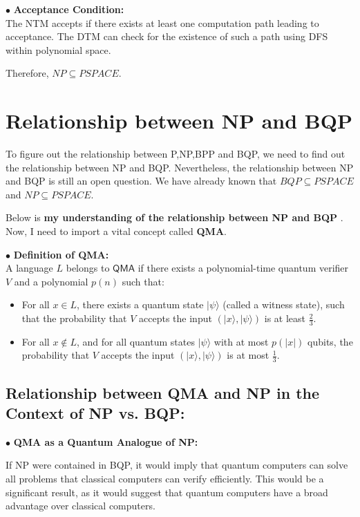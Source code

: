 \documentclass[a4paper]{article}
\begin{document}
\noindent $\bullet$ \textbf{Acceptance Condition:}\\
The NTM accepts if there exists at least one computation path leading to acceptance.
The DTM can check for the existence of such a path using DFS within polynomial space.

Therefore, $NP \subseteq PSPACE$.

\section{Relationship between NP and BQP}
To figure out the relationship between P,NP,BPP and BQP, we need to find out the relationship between NP and BQP. Nevertheless, the relationship between NP and BQP is still an open question. 
We have already known that $BQP \subseteq  PSPACE$ and $NP \subseteq PSPACE$.

Below is \textbf{my understanding of the relationship between NP and BQP} . 
Now, I need to import a vital concept called \textbf{QMA}.

\noindent $\bullet$ \textbf{Definition of QMA: }\\
A language \( L \) belongs to \( \mathsf{QMA} \) if there exists a polynomial-time quantum verifier \( V \) and a polynomial \( p(n) \) such that:
\begin{itemize}
    \item For all \( x \in L \), there exists a quantum state \( |\psi\rangle \) (called a witness state), such that the probability that \( V \) accepts the input \( (|x\rangle, |\psi\rangle) \) is at least \( \frac{2}{3} \).
    \item For all \( x \notin L \), and for all quantum states \( |\psi\rangle \) with at most \( p(|x|) \) qubits, the probability that \( V \) accepts the input \( (|x\rangle, |\psi\rangle) \) is at most \( \frac{1}{3} \).
\end{itemize}

\subsection{Relationship between QMA and NP in the Context of NP vs. BQP:}
\noindent $\bullet$ \textbf{ QMA as a Quantum Analogue of NP:}

If NP were contained in BQP, it would imply that quantum computers can solve all problems that classical computers can verify efficiently. This would be a significant result, as it would suggest that quantum computers have a broad advantage over classical computers.
\end{document}
